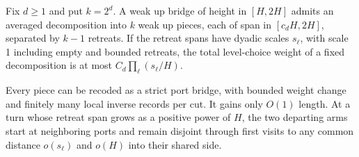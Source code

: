 \begin{lemma}\label{09_fast_paths:turns}
Fix \(d\ge1\) and put \(k=2^d\).  A weak up bridge of height in
\([H,2H]\) admits an averaged decomposition into \(k\) weak up
pieces, each of span in \([c_dH,2H]\), separated by \(k-1\) retreats.
If the retreat spans have dyadic scales \(s_\ell\), with scale 1
including empty and bounded retreats, the total level-choice weight
of a fixed decomposition is at most
\(C_d\prod_\ell(s_\ell/H)\).

Every piece can be recoded as a strict port bridge, with bounded weight
change and finitely many local inverse records per cut.  It gains only
\(O(1)\) length.  At a turn whose retreat span grows as a positive
power of \(H\), the two departing arms start at neighboring ports
and remain disjoint through first visits to any common distance
\(o(s_\ell)\) and \(o(H)\) into their shared side.
\end{lemma}
